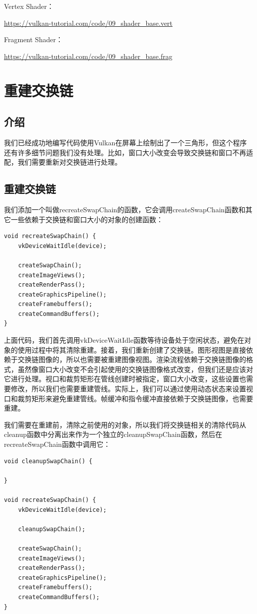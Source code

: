 \documentclass{ctexart}
\begin{document}
Vertex Shader：

\url{https://vulkan-tutorial.com/code/09_shader_base.vert}

Fragment Shader：

\url{https://vulkan-tutorial.com/code/09_shader_base.frag}

\newpage
\section{重建交换链}

\subsection{介绍}

我们已经成功地编写代码使用Vulkan在屏幕上绘制出了一个三角形，但这个程序还有许多细节问题我们没有处理。比如，窗口大小改变会导致交换链和窗口不再适配，我们需要重新对交换链进行处理。

\subsection{重建交换链}

我们添加一个叫做recreateSwapChain的函数，它会调用createSwapChain函数和其它一些依赖于交换链和窗口大小的对象的创建函数：

\begin{lstlisting}[language={[ANSI]C}]
void recreateSwapChain() {
	vkDeviceWaitIdle(device);

	createSwapChain();
	createImageViews();
	createRenderPass();
	createGraphicsPipeline();
	createFramebuffers();
	createCommandBuffers();
}
\end{lstlisting}

上面代码，我们首先调用vkDeviceWaitIdle函数等待设备处于空闲状态，避免在对象的使用过程中将其清除重建。接着，我们重新创建了交换链。图形视图是直接依赖于交换链图像的，所以也需要被重建图像视图。渲染流程依赖于交换链图像的格式，虽然像窗口大小改变不会引起使用的交换链图像格式改变，但我们还是应该对它进行处理。视口和裁剪矩形在管线创建时被指定，窗口大小改变，这些设置也需要修改，所以我们也需要重建管线。实际上，我们可以通过使用动态状态来设置视口和裁剪矩形来避免重建管线。帧缓冲和指令缓冲直接依赖于交换链图像，也需要重建。

我们需要在重建前，清除之前使用的对象，所以我们将交换链相关的清除代码从cleanup函数中分离出来作为一个独立的cleanupSwapChain函数，然后在recreateSwapChain函数中调用它：

\begin{lstlisting}[language={[ANSI]C}]
void cleanupSwapChain() {

}

void recreateSwapChain() {
	vkDeviceWaitIdle(device);

	cleanupSwapChain();

	createSwapChain();
	createImageViews();
	createRenderPass();
	createGraphicsPipeline();
	createFramebuffers();
	createCommandBuffers();
}
\end{lstlisting}
\end{document}
